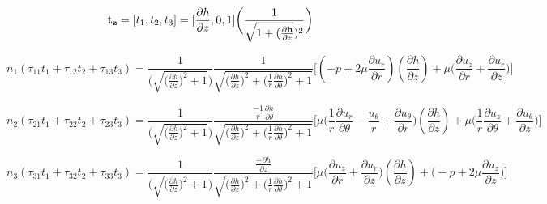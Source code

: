 \documentclass{article}
\begin{document}
{\begin{equation*}
{\bf t_{z}} = [t_{1} ,t_{2}, t_{3}] =  [{\frac{\partial h}{\partial z}}, 0 , 1]\bigg(\frac{1}{\sqrt{1 + (\frac{\partial {\bf h}}{\partial z}})^2}\bigg)
\end{equation*}

\begin{equation}
n_{1}(\tau_{11}t_{1} + \tau_{12}t_{2} + \tau_{13}t_{3}) = \frac{1}{\bigg(\sqrt{\bigg(\frac{\partial h}{\partial z}\bigg)^2 +  1}\bigg)}\frac{1}{\sqrt{\bigg(\frac{\partial h}{\partial z}\bigg)^2 + \bigg(\frac{1}{r}\frac{\partial h}{\partial \theta}\bigg)^2 + 1}}\bigg[(-p + 2\mu \frac{\partial u_{r}}{\partial r})(\frac{\partial h}{\partial z}) + \mu \bigg(\frac{\partial u_{z}}{\partial r} + \frac{\partial u_{r}}{\partial z}\bigg)\bigg]
\end{equation}

\begin{equation}
 n_{2}(\tau_{21}t_{1} + \tau_{22}t_{2} + \tau_{23}t_{3}) = \frac{1}{\bigg(\sqrt{\bigg(\frac{\partial h}{\partial z}\bigg)^2 +  1}\bigg)}\frac{\frac{-1}{r}\frac{\partial h}{\partial \theta}}{\sqrt{\bigg(\frac{\partial h}{\partial z}\bigg)^2 + \bigg(\frac{1}{r}\frac{\partial h}{\partial \theta}\bigg)^2 + 1}}\bigg[\mu \bigg(\frac{1}{r}\frac{\partial u_{r}}{\partial \theta} -\frac{u_{\theta}}{r}+\frac{\partial u_{\theta}}{\partial r}\bigg)(\frac{\partial h}{\partial z}) + \mu \bigg(\frac{1}{r}\frac{\partial u_{z}}{\partial \theta} + \frac{\partial u_{\theta}}{\partial z}\bigg)\bigg]
\end{equation}


\begin{equation}
n_{3}(\tau_{31}t_{1} + \tau_{32}t_{2} + \tau_{33}t_{3}) = \frac{1}{\bigg(\sqrt{\bigg(\frac{\partial h}{\partial z}\bigg)^2 +  1}\bigg)}\frac{\frac{-\partial h}{\partial z}}{\sqrt{\bigg(\frac{\partial h}{\partial z}\bigg)^2 + \bigg(\frac{1}{r}\frac{\partial h}{\partial \theta}\bigg)^2 + 1}}\bigg[\mu \bigg(\frac{\partial u_{z}}{\partial r} + \frac{\partial u_{r}}{\partial z}\bigg)(\frac{\partial h}{\partial z}) + \bigg(-p + 2\mu \frac{\partial u_{z}}{\partial z}\bigg)\bigg]
\end{equation}
\newline

}
\end{document}
